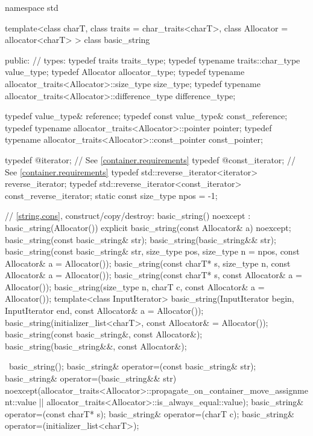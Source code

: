 %
\begin{codeblock}
namespace std {
  template<class charT, class traits = char_traits<charT>,
    class Allocator = allocator<charT> >
  class basic_string {
  public:
    // types:
    typedef          traits                                         traits_type;
    typedef typename traits::char_type                              value_type;
    typedef          Allocator                                      allocator_type;
    typedef typename allocator_traits<Allocator>::size_type         size_type;
    typedef typename allocator_traits<Allocator>::difference_type   difference_type;

    typedef value_type& reference;
    typedef const value_type&   const_reference;
    typedef typename allocator_traits<Allocator>::pointer           pointer;
    typedef typename allocator_traits<Allocator>::const_pointer     const_pointer;

    typedef @\impdef@              iterator;       // See \ref{container.requirements}
    typedef @\impdef@              const_iterator; // See \ref{container.requirements}
    typedef std::reverse_iterator<iterator> reverse_iterator;
    typedef std::reverse_iterator<const_iterator> const_reverse_iterator;
    static const size_type npos = -1;

    // \ref{string.cons}, construct/copy/destroy:
    basic_string() noexcept : basic_string(Allocator()) { }
    explicit basic_string(const Allocator& a) noexcept;
    basic_string(const basic_string& str);
    basic_string(basic_string&& str);
    basic_string(const basic_string& str, size_type pos, size_type n = npos,
                 const Allocator& a = Allocator());
    basic_string(const charT* s,
                 size_type n, const Allocator& a = Allocator());
    basic_string(const charT* s, const Allocator& a = Allocator());
    basic_string(size_type n, charT c, const Allocator& a = Allocator());
    template<class InputIterator>
      basic_string(InputIterator begin, InputIterator end,
                   const Allocator& a = Allocator());
    basic_string(initializer_list<charT>, const Allocator& = Allocator());
    basic_string(const basic_string&, const Allocator&);
    basic_string(basic_string&&, const Allocator&);

   ~basic_string();
    basic_string& operator=(const basic_string& str);
    basic_string& operator=(basic_string&& str)
      noexcept(allocator_traits<Allocator>::propagate_on_container_move_assignment::value ||
               allocator_traits<Allocator>::is_always_equal::value);
    basic_string& operator=(const charT* s);
    basic_string& operator=(charT c);
    basic_string& operator=(initializer_list<charT>);

}}
\end{codeblock}
